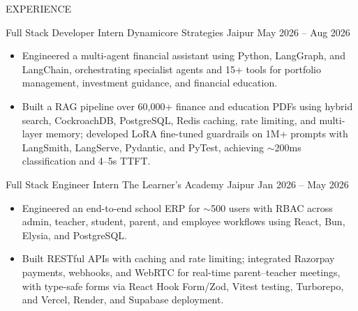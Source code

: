 \documentclass{resume} %
\begin{document}
\vspace{-2pt}


\begin{rSection}{EXPERIENCE}

\setlength{\parskip}{6pt}
\setlength{\parindent}{2pt}

\experienceHeading
{Full Stack Developer Intern}
{Dynamicore Strategies}
{Jaipur}
{May 2026 -- Aug 2026}

\begin{itemize}
    \itemsep -3pt {}

    \item Engineered a multi-agent financial assistant using Python, LangGraph, and LangChain, orchestrating specialist agents and 15+ tools for portfolio management, investment guidance, and financial education.

    \item Built a RAG pipeline over 60,000+ finance and education PDFs using hybrid search, CockroachDB, PostgreSQL, Redis caching, rate limiting, and multi-layer memory; developed LoRA fine-tuned guardrails on 1M+ prompts with LangSmith, LangServe, Pydantic, and PyTest, achieving $\sim$200ms classification and 4--5s TTFT.

\end{itemize}


\experienceHeading
{Full Stack Engineer Intern}
{The Learner's Academy}
{Jaipur}
{Jan 2026 -- May 2026}

\begin{itemize}
    \itemsep -3pt {}

    \item Engineered an end-to-end school ERP for $\sim$500 users with RBAC across admin, teacher, student, parent, and employee workflows using React, Bun, Elysia, and PostgreSQL.

    \item Built RESTful APIs with caching and rate limiting; integrated Razorpay payments, webhooks, and WebRTC for real-time parent--teacher meetings, with type-safe forms via React Hook Form/Zod, Vitest testing, Turborepo, and Vercel, Render, and Supabase deployment.

\end{itemize}

\end{rSection}
\end{document}
